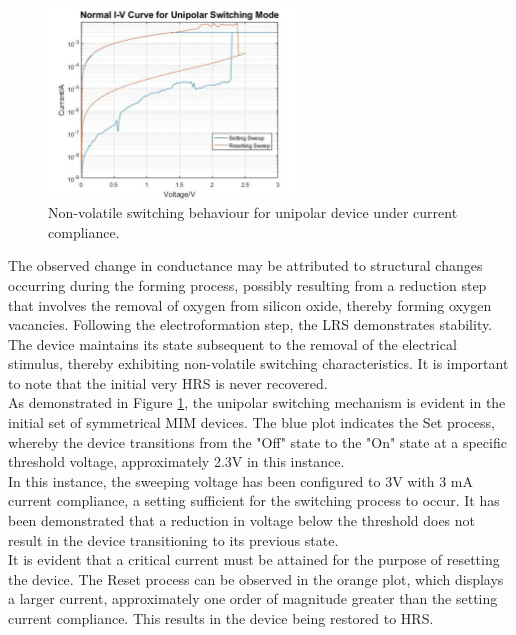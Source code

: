 \begin{figure}[htbp!] 
    \centering    
    \includegraphics[width=0.6\textwidth]{Chapter3/Figs/h.png}
    \caption[Non-volatile switching behaviour for unipolar device under current compliance.]{Non-volatile switching behaviour for unipolar device under current compliance.}
    \label{fig:3h}
\end{figure}

\noindent The observed change in conductance may be attributed to structural changes occurring during the forming process, possibly resulting from a reduction step that involves the removal of oxygen from silicon oxide, thereby forming oxygen vacancies. Following the electroformation step, the LRS demonstrates stability. The device maintains its state subsequent to the removal of the electrical stimulus, thereby exhibiting non-volatile switching characteristics. It is important to note that the initial very HRS is never recovered. \\

\noindent As demonstrated in Figure \ref{fig:3h}, the unipolar switching mechanism is evident in the initial set of symmetrical MIM devices. The blue plot indicates the Set process, whereby the device transitions from the "Off" state to the "On" state at a specific threshold voltage, approximately 2.3V in this instance. \\

\noindent In this instance, the sweeping voltage has been configured to 3V with 3 mA current compliance, a setting sufficient for the switching process to occur. It has been demonstrated that a reduction in voltage below the threshold does not result in the device transitioning to its previous state.\\

\noindent It is evident that a critical current must be attained for the purpose of resetting the device. The Reset process can be observed in the orange plot, which displays a larger current, approximately one order of magnitude greater than the setting current compliance. This results in the device being restored to HRS. \\


